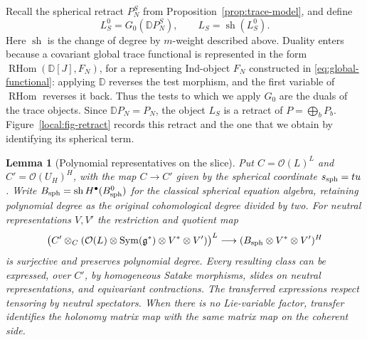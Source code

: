 \documentclass[11pt]{article}
\numberwithin{equation}{section}
\newtheorem{lemma}[theorem]{Lemma}
\theoremstyle{definition}
\theoremstyle{remark}
\newcommand{\g}{\mathfrak g}
\newcommand{\cO}{\mathcal O}
\newcommand{\RHom}{\operatorname{RHom}}
\newcommand{\Sym}{\operatorname{Sym}}
\begin{document}
Recall the spherical retract $P_N^S$ from
Proposition~\ref{prop:trace-model}, and define
\[
 L_S^0=G_0(\mathbb DP_N^S),\qquad
 L_S=\operatorname{sh}(L_S^0).
\]
Here $\operatorname{sh}$ is the change of degree by $m$-weight described
above.  Duality enters because a covariant global trace functional is
represented in the form $\RHom(\mathbb D[J],F_N)$, for a representing
Ind-object $F_N$ constructed in \eqref{eq:global-functional}: applying
$\mathbb D$ reverses the test morphism, and the first variable of
$\RHom$ reverses it back.  Thus the tests to which we apply $G_0$
are the duals of the trace objects.  Since $\mathbb DP_N=P_N$, the object $L_S$ is a retract of
$P=\bigoplus_bP_b$.
Figure~\ref{local:fig-retract} records this retract and the one that
we obtain by identifying its spherical term.

\begin{lemma}[Polynomial representatives on the slice]
\label{local:polynomial-representatives}
Put $C=\cO(L)^L$ and $C'=\cO(U_H)^H$, with the map $C\to C'$
given by the spherical coordinate $s_{\rm sph}=tu$.  Write
$B_{\rm sph}=\operatorname{sh}H^\bullet(B_{\rm sph}^0)$ for the
classical spherical equation algebra, retaining polynomial degree
as the original cohomological degree divided by two.  For neutral
representations $V,V'$ the restriction and quotient map
\begin{equation}\label{local:eq-polynomial-surjection}
 \bigl(C'\otimes_C
    (\cO(L)\otimes\Sym(\g^*)\otimes V^*\otimes V')\bigr)^L
 \longrightarrow
 (B_{\rm sph}\otimes V^*\otimes V')^H
\end{equation}
is surjective and preserves polynomial degree.  Every resulting class
can be expressed, over $C'$, by homogeneous Satake morphisms, slides
on neutral representations, and equivariant contractions.  The
transferred expressions respect tensoring by neutral spectators.
When there is no Lie-variable factor, transfer identifies the
holonomy matrix map with the same matrix map on the coherent side.
\end{lemma}
\end{document}
